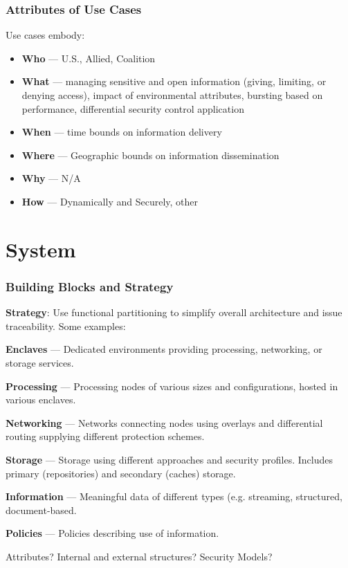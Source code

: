 \documentclass[t,handout]{beamer}
\begin{document}
\begin{frame}
\frametitle{Attributes of Use Cases}
Use cases embody:
\begin{itemize}
\item {\bf Who} --- U.S., Allied, Coalition
\item {\bf What} --- managing sensitive and open information (giving, limiting, or denying access), impact of environmental attributes, bursting based on performance, differential security control application
\item {\bf When} --- time bounds on information delivery
\item {\bf Where} --- Geographic bounds on information dissemination
\item {\bf Why} --- N/A
\item {\bf How} --- Dynamically and Securely, other
\end{itemize}
\end{frame}

\section{System}

\begin{frame}
\frametitle{Building Blocks and Strategy}
{\bf Strategy}: Use functional partitioning to simplify overall architecture and issue traceability. Some examples:
\begin{itemize}
{\small 
\item {\bf Enclaves} --- Dedicated environments providing processing, networking, or storage services.
\item {\bf Processing} --- Processing nodes of various sizes and configurations, hosted in various enclaves.
\item {\bf Networking} --- Networks connecting nodes using overlays and differential routing supplying different protection schemes.
\item {\bf Storage} --- Storage using different approaches and security profiles.  Includes primary (repositories) and secondary (caches) storage.
\item {\bf Information} --- Meaningful data of different types (e.g. streaming, structured, document-based.
\item {\bf Policies} --- Policies describing use of information.
}
\end{itemize}
Attributes? Internal and external structures? Security Models?
\end{frame}
\end{document}

